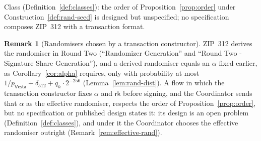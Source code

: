 \documentclass[11pt,a4paper]{article}
\theoremstyle{definition}
\newtheorem{remark}[theorem]{Remark}
\newcommand{\rk}{\mathsf{rk}}
\newcommand{\Vesta}{\ensuremath{\mathsf{Vesta}}}
\begin{document}
Class (Definition~\ref{def:classes}): the order of
Proposition~\ref{prop:order} under Construction~\ref{def:rand-seed} is
designed but unspecified; no specification composes ZIP~312 with a
transaction format.

\begin{remark}[Randomisers chosen by a transaction constructor]
\label{rem:constructor-alpha}
ZIP~312 derives the randomiser in Round Two (``Randomizer Generation'' and
``Round Two - Signature Share Generation''), and a derived
randomiser equals an \(\alpha\) fixed earlier, as Corollary~\ref{cor:alpha}
requires, only with probability at most
\(1/p_{\Vesta} + \delta_{512} + q_h \cdot 2^{-256}\)
(Lemma~\ref{lem:rand-dist}). A flow in which the transaction
constructor fixes \(\alpha\) and \(\rk\) before signing, and the
Coordinator sends that \(\alpha\) as the effective randomiser, respects the
order of Proposition~\ref{prop:order}, but no specification or published
design states it: its design is an open problem
(Definition~\ref{def:classes}), and under it the Coordinator chooses the
effective randomiser outright (Remark~\ref{rem:effective-rand}).
\end{remark}
\end{document}
